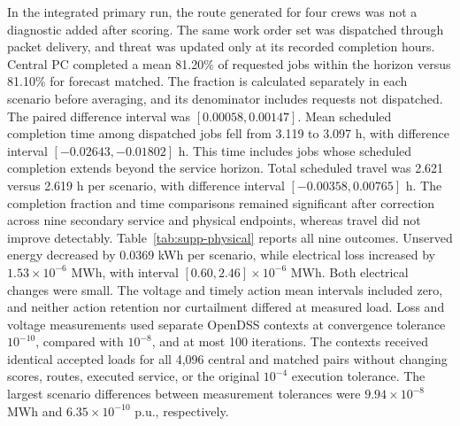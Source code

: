 \documentclass[journal]{IEEEtran}
\begin{document}
In the integrated primary run, the route generated for four crews was not a diagnostic added
after scoring.  The same work order set was dispatched through packet delivery,
and threat was updated only at its recorded completion hours.  Central PC
completed a mean 81.20\% of requested jobs within the horizon versus 81.10\%
for forecast matched.  The fraction is calculated separately in each scenario
before averaging, and its denominator includes requests not dispatched.
The paired difference interval was $[0.00058,0.00147]$.  Mean scheduled
completion time among dispatched jobs fell from 3.119 to 3.097 h, with
difference interval $[-0.02643,-0.01802]$ h.  This time includes jobs whose
scheduled completion extends beyond the service horizon.  Total scheduled
travel was 2.621 versus 2.619 h per scenario, with difference interval
$[-0.00358,0.00765]$ h.  The completion fraction and time comparisons remained
significant after correction across nine secondary service and physical
endpoints, whereas travel did not improve detectably.
Table~\ref{tab:supp-physical} reports all nine outcomes.  Unserved energy decreased
by 0.0369 kWh per scenario, while electrical loss increased by
$1.53\times10^{-6}$ MWh, with interval
$[0.60,2.46]\times10^{-6}$ MWh.  Both electrical changes were small.  The voltage and
timely action mean intervals included zero, and neither action retention nor
curtailment differed at measured load.
Loss and voltage measurements used separate OpenDSS contexts at convergence
tolerance $10^{-10}$, compared with $10^{-8}$, and at most 100 iterations.
The contexts received identical accepted loads for all 4,096 central and matched
pairs without changing scores, routes, executed service, or the original
$10^{-4}$ execution tolerance.  The largest scenario differences between
measurement tolerances were $9.94\times10^{-8}$ MWh and
$6.35\times10^{-10}$ p.u., respectively.
\end{document}
